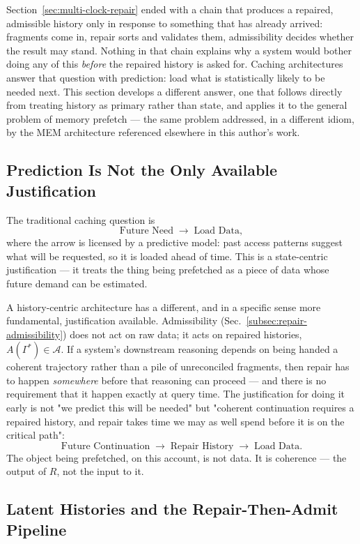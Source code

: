 \documentclass[12pt,a4paper]{article}
\theoremstyle{plain}
\theoremstyle{definition}
\theoremstyle{remark}
\begin{document}
Section~\ref{sec:multi-clock-repair} ended with a chain that produces a repaired, admissible history only in response to something that has already arrived: fragments come in, repair sorts and validates them, admissibility decides whether the result may stand. Nothing in that chain explains why a system would bother doing any of this \emph{before} the repaired history is asked for. Caching architectures answer that question with prediction: load what is statistically likely to be needed next. This section develops a different answer, one that follows directly from treating history as primary rather than state, and applies it to the general problem of memory prefetch — the same problem addressed, in a different idiom, by the MEM architecture referenced elsewhere in this author's work.

\subsection{Prediction Is Not the Only Available Justification}
\label{subsec:prefetch-justification}

The traditional caching question is
\[
\text{Future Need} \;\longrightarrow\; \text{Load Data},
\]
where the arrow is licensed by a predictive model: past access patterns suggest what will be requested, so it is loaded ahead of time. This is a state-centric justification — it treats the thing being prefetched as a piece of data whose future demand can be estimated.

A history-centric architecture has a different, and in a specific sense more fundamental, justification available. Admissibility (Sec.~\ref{subsec:repair-admissibility}) does not act on raw data; it acts on repaired histories, $A(\Gamma^{*}) \in \mathcal{A}$. If a system's downstream reasoning depends on being handed a coherent trajectory rather than a pile of unreconciled fragments, then repair has to happen \emph{somewhere} before that reasoning can proceed — and there is no requirement that it happen exactly at query time. The justification for doing it early is not "we predict this will be needed" but "coherent continuation requires a repaired history, and repair takes time we may as well spend before it is on the critical path":
\[
\text{Future Continuation} \;\longrightarrow\; \text{Repair History} \;\longrightarrow\; \text{Load Data}.
\]
The object being prefetched, on this account, is not data. It is coherence — the output of $R$, not the input to it.

\subsection{Latent Histories and the Repair-Then-Admit Pipeline}
\label{subsec:latent-histories}
\end{document}
